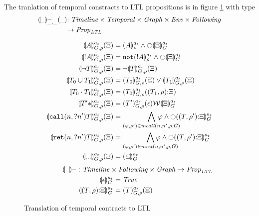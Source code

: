 \documentclass[preprint,onecolumn,9pt]{sigplanconf} %
\begin{document}
The tranlation of temporal constracts to LTL propositions is in figure \ref{fig:translation} with type
\begin{align*}
{\scriptsize \toltl{\_}{\_}{\_}{\_}{\_}} &{\scriptsize : \Timeline \times \TContract \times \Graph \times \Env \times \TConEnvStack}\\ & {\scriptsize \to \LTLProp}
\end{align*}
\begin{figure}
  \begin{align*}
   \toltl{\mtimeline}{\mevent}{\mgraph}{\menv}{\mtestack} &=
     \ltland{\denoteevent{\mevent}{\menv}{\mtimeline}}
            {\ltlnext{\stacktoltl{\mtimeline}{\mtestack}{\mgraph}}}
    \\
    \toltl{\mtimeline}{\snonevent{\mevent}}{\mgraph}{\menv}{\mtestack} &=
      \ltland{\apneg{\denoteevent{\snonevent{\mevent}}{\menv}{\mtimeline}}}
             {\ltlnext{\stacktoltl{\mtimeline}{\mtestack}{\mgraph}}}
    \\
    \toltl{\mtimeline}{\stnot{\mtcon}}{\mgraph}{\menv}{\mtestack} &=
      \ltlnot{\toltl{\mtimeline}{\mtcon}{\mgraph}{\menv}{\mtestack}}
    \\
    \toltl{\mtimeline}{\stOr{\mtcon_0}{\mtcon_1}}{\mgraph}{\menv}{\mtestack} &=
      \ltlor{\toltl{\mtimeline}{\mtcon_0}{\mgraph}{\menv}{\mtestack}}
            {\toltl{\mtimeline}{\mtcon_1}{\mgraph}{\menv}{\mtestack}}
    \\
    \toltl{\mtimeline}{\stseq{\mtcon_0}{\mtcon_1}}{\mgraph}{\menv}{\mtestack} &=
      \toltl{\mtimeline}{\mtcon_0}{\mgraph}{\menv}{\cons{(\mtcon_1,\menv)}{\mtestack}}
    \\
    \toltl{\mtimeline}{\stmany{\mtconNoB}}{\mgraph}{\menv}{\mtestack} &=
      \ltlW{\toltl{\mtimeline}{\mtconNoB}{\mgraph}{\menv}{\emptytestack}}{\stacktoltl{\mtimeline}{\mtestack}{\mgraph}}
    \\
    \toltl{\mtimeline}{\stcall{\mname}{\mname'}{\mtcon}}{\mgraph}{\menv}{\mtestack} &=
      \bigwedge\limits_{(\ltlprop,\menv') \in \matchcall(\mname,\mname',\menv,\mgraph)}{
        \mkern-60mu\ltland{\ltlprop}{\ltlnext{\stacktoltl{\mtimeline}{\cons{(\mtcon,\menv')}{\mtestack}}{\mgraph}}}}
    \\
    \toltl{\mtimeline}{\stret{\mname}{\mname'}{\mtcon}}{\mgraph}{\menv}{\mtestack} &=
      \bigwedge\limits_{(\ltlprop,\menv') \in \matchret(\mname,\mname',\menv,\mgraph)}{
        \mkern-60mu\ltland{\ltlprop}{\ltlnext{\stacktoltl{\mtimeline}{\cons{(\mtcon,\menv')}{\mtestack}}{\mgraph}}}}
    \\
      \toltl{\mtimeline}{\sddd}{\mgraph}{\menv}{\mtestack} &= \stacktoltl{\mtimeline}{\mtestack}{\mgraph}
\\[2pt]
    {\scriptsize \stacktoltl{\_}{\_}{\_} : \Timeline \times \TConEnvStack \times \Graph \to \LTLProp} \span\omit
\\
    \stacktoltl{\mtimeline}{\emptytestack}{\mgraph} &= \ltlTrue
\\
    \stacktoltl{\mtimeline}{\cons{(\mtcon,\menv)}{\mtestack}}{\mgraph} &=
      \toltl{\mtimeline}{\mtcon}{\mgraph}{\menv}{\mtestack}
  \end{align*}
  
  \caption{Translation of temporal contracts to LTL}
\label{fig:translation}
\end{figure}
\end{document}
